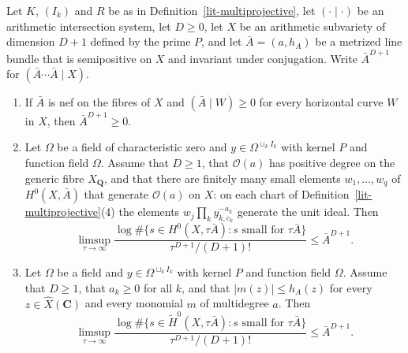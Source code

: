 \begin{proposition}\label{lit-hilbert-samuel-upper}
Let $K$, $(I_k)$ and $R$ be as in Definition~\ref{lit-multiprojective}, let
$(\cdot\mid\cdot)$ be an arithmetic intersection system, let $D\ge0$, let $X$
be an arithmetic subvariety of dimension $D+1$ defined by the prime $P$, and
let $\bar A=(a,h_A)$ be a metrized line bundle that is semipositive on $X$ and
invariant under conjugation. Write $\bar A^{D+1}$ for
$(\bar A\cdots\bar A\mid X)$.
\begin{enumerate}
\item If $\bar A$ is nef on the fibres of $X$ and $(\bar A\mid W)\ge0$ for
  every horizontal curve $W$ in $X$, then $\bar A^{D+1}\ge0$.
\item Let $\Omega$ be a field of characteristic zero and $y\in\Omega^{\sqcup_kI_k}$
  with kernel $P$ and function field $\Omega$. Assume that $D\ge1$, that
  $\mathcal O(a)$ has positive degree on the generic fibre $X_{\mathbf Q}$, and
  that there are finitely many small elements $w_1,\ldots,w_q$ of
  $H^0(X,\bar A)$ that generate $\mathcal O(a)$ on $X$: on each chart of
  Definition~\ref{lit-multiprojective}(4) the elements
  $w_j\prod_ky_{k,c_k}^{-a_k}$ generate the unit ideal. Then
  \[
  \limsup_{\tau\to\infty}\frac{\log\#\{s\in H^0(X,\tau\bar A):s\text{ small for }\tau\bar A\}}
  {\tau^{D+1}/(D+1)!}\le\bar A^{D+1}.
  \]
\item Let $\Omega$ be a field and $y\in\Omega^{\sqcup_kI_k}$ with kernel $P$ and
  function field $\Omega$. Assume that $D\ge1$, that $a_k\ge0$ for all $k$, and
  that $|m(z)|\le h_A(z)$ for every $z\in\hat X(\mathbf C)$ and every monomial
  $m$ of multidegree $a$. Then
  \[
  \limsup_{\tau\to\infty}\frac{\log\#\{s\in\tilde H^0(X,\tau\bar A):s\text{ small for }\tau\bar A\}}
  {\tau^{D+1}/(D+1)!}\le\bar A^{D+1}.
  \]
\end{enumerate}
\end{proposition}

